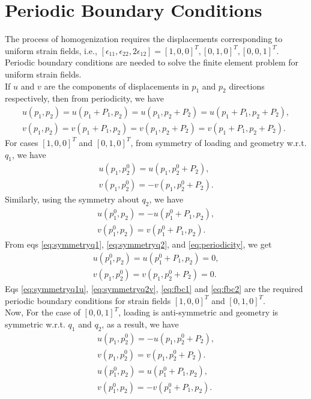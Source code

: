 \documentclass[openright,twoside]{iitkthesis}
\begin{document}
\section{Periodic Boundary Conditions}
The process of homogenization requires the displacements corresponding to uniform strain fields, i.e., $[\epsilon_{11}, \epsilon_{22}, 2\epsilon_{12}] = [1, 0, 0]^T, [0, 1, 0]^T, [0, 0, 1]^T$. Periodic boundary conditions are needed to solve the finite element problem for uniform strain fields.\\
If $u$ and $v$ are the components of displacements in $p_1$ and $p_2$ directions respectively, then from periodicity, we have
\begin{equation}
\label{eq:periodicity}
\begin{split}
u(p_1, p_2) = u(p_1+P_1, p_2) = u(p_1, p_2+P_2) = u(p_1+P_1, p_2+P_2),\\
v(p_1, p_2) = v(p_1+P_1, p_2) = v(p_1, p_2+P_2) = v(p_1+P_1, p_2+P_2).
\end{split}
\end{equation}
For cases $[1, 0, 0]^T$ and $[0, 1, 0]^T$, from symmetry of loading and geometry w.r.t. $q_1$, we have
\begin{eqnarray}
\label{eq:symmetryq1u}
u(p_1, p_2^0) = u(p_1, p_2^0+P_2),\\
\label{eq:symmetryq1}
v(p_1, p_2^0) = -v(p_1, p_2^0+P_2).
\end{eqnarray}
Similarly, using the symmetry about $q_2$, we have
\begin{eqnarray}
\label{eq:symmetryq2}
u(p_1^0, p_2) = -u(p_1^0+P_1, p_2),\\
\label{eq:symmetryq2v}
v(p_1^0, p_2) = v(p_1^0+P_1, p_2).
\end{eqnarray}
From eqs \eqref{eq:symmetryq1}, \eqref{eq:symmetryq2}, and \eqref{eq:periodicity}, we get
\begin{eqnarray}
\label{eq:fbc1}
u(p_1^0, p_2) = u(p_1^0+P_1, p_2) = 0,\\
\label{eq:fbc2}
v(p_1, p_2^0) = v(p_1, p_2^0+P_2) = 0.
\end{eqnarray}
Eqs \eqref{eq:symmetryq1u}, \eqref{eq:symmetryq2v}, \eqref{eq:fbc1} and 
\eqref{eq:fbc2} are the required periodic boundary conditions for strain fields $[1, 0, 0]^T$ and $[0, 1, 0]^T$.
\\
Now, For the case of $[0, 0, 1]^T$, loading is anti-symmetric and geometry is symmetric w.r.t. $q_1$ and $q_2$, as a result, we have
\begin{eqnarray}
\label{eq:symmetryq1u}
u(p_1, p_2^0) = -u(p_1, p_2^0+P_2),\\
\label{eq:symmetryq1}
v(p_1, p_2^0) = v(p_1, p_2^0+P_2).\\
\label{eq:symmetryq2}
u(p_1^0, p_2) = u(p_1^0+P_1, p_2),\\
\label{eq:symmetryq2v}
v(p_1^0, p_2) = -v(p_1^0+P_1, p_2).
\end{eqnarray}
\end{document}
